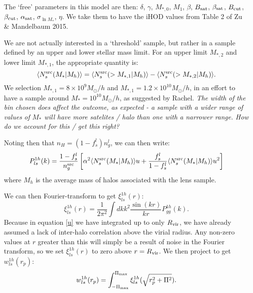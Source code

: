 \documentclass[onecolumn,amsmath,aps,fleqn, superscriptaddress]{revtex4}
\begin{document}
The `free' parameters in this model are then: $\delta$, $\gamma$, $M_{*,0}$, $M_1$, $\beta$, $B_{\rm sat}$, $\beta_{\rm sat}$, $B_{\rm cut}$, $\beta_{\rm cut}$, $\alpha_{\rm sat}$, $\sigma_{\ln M_*}$, $\eta$. We take them to have the iHOD values from Table 2 of Zu \& Mandelbaum 2015. 


We are not actually interested in a `threshold' sample, but rather in a sample defined by an upper and lower stellar mass limit. For an upper limit $M_{*,2}$ and lower limit $M_{*,1}$, the appropriate quantity is:
\begin{equation}
\langle  N_s^{\rm src} (M_{*} | M_h) \rangle = \langle  N_s^{\rm src} (>M_{*,1} | M_h) \rangle - \langle  N_s^{\rm src} (>M_{*,2} | M_h) \rangle.
\label{Nsmean_sources_binned}
\end{equation}
We selection $M_{*,1} = 8\times10^{9} M_\odot / h$ and $M_{*,1} = 1.2\times10^{10} M_\odot / h$, in an effort to have a sample around $M_* = 10^{10} M_\odot / h$, as suggested by Rachel. {\it The width of the bin chosen does affect the outcome, as expected - a sample with a wider range of values of $M_*$ will have more satelites / halo than one with a narrower range. How do we account for this / get this right?}

Noting then that $n_H = (1-f_s^l) n_g^l$, we can then write:
\begin{equation}
P_{ls}^{1h}(k) = \frac{1-f_s^l}{n_g^{\rm src}}\left[\alpha^2  \langle  N_s^{\rm src} (M_* | M_h) \rangle u + \frac{f_s^l}{1-f_s^l} \langle  N_s^{\rm src} (M_* | M_h) \rangle u^2\right]
\label{1hpgg_fs}
\end{equation}
where $M_h$ is the average mass of halos associated with the lens sample.

We can then Fourier-transform to get $\xi^{1h}_{ls}(r)$:
\begin{equation}
\xi_{ls}^{1h}(r) = \frac{1}{2\pi^2} \int dk k^2 \frac{\sin(kr)}{kr} P_{gg}^{1h}(k).
\label{xils1h}
\end{equation}
Because in equation \ref{u} we have integrated up to only $R_{\rm vir}$, we have already assumed a lack of inter-halo correlation above the virial radius. Any non-zero values at $r$ greater than this will simply be a result of noise in the Fourier transform, so we set $\xi_{ls}^{1h}(r)$ to zero above $r= R_{\rm vir}$. We then project to get $w_{ls}^{1h}(r_p)$:
\begin{equation}
w_{ls}^{1h}(r_p) = \int_{-\Pi_{\rm max}}^{\Pi_{\rm max}} \xi_{ls}^{1h}(\sqrt{r_p^2 + \Pi^2}).
\label{wl1h}
\end{equation}
\end{document}
